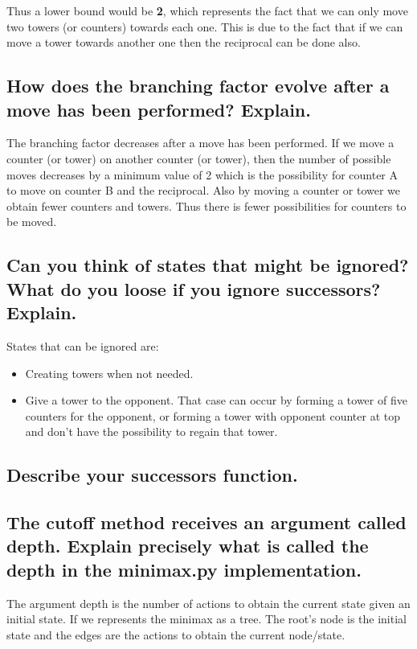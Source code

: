 \documentclass[10pt,a4paper]{article}
\begin{document}
Thus a lower bound would be \textbf{2}, which represents the fact that we can only move two towers (or counters) towards each one. This is due to the fact that if we can move a tower towards another one then the reciprocal can be done also. 

\subsection{How does the branching factor evolve after a move has been performed? Explain.}

The branching factor decreases after a move has been performed. If we move a counter (or tower) on another counter (or tower), then the number of possible moves decreases by a minimum value of 2 which is the possibility for counter A to move on counter B and the reciprocal. Also by moving a counter or tower we obtain fewer counters and towers. Thus there is fewer possibilities for counters to be moved.

\subsection{Can you think of states that might be ignored? What do you loose if you ignore successors? Explain.}

States that can be ignored are:
\begin{itemize}
\item Creating towers when not needed.
\item Give a tower to the opponent. That case can occur by forming a tower of five counters for the opponent, or forming a tower with opponent counter at top and don't have the possibility to regain that tower.
\end{itemize}

\subsection{Describe your successors function.}


\subsection{The cutoff method receives an argument called depth. Explain precisely what is called the depth in the minimax.py implementation.}

The argument depth is the number of actions to obtain the current state given an initial state. If we represents the minimax as a tree. The root's node is the initial state and the edges are the actions to obtain the current node/state.
\end{document}
